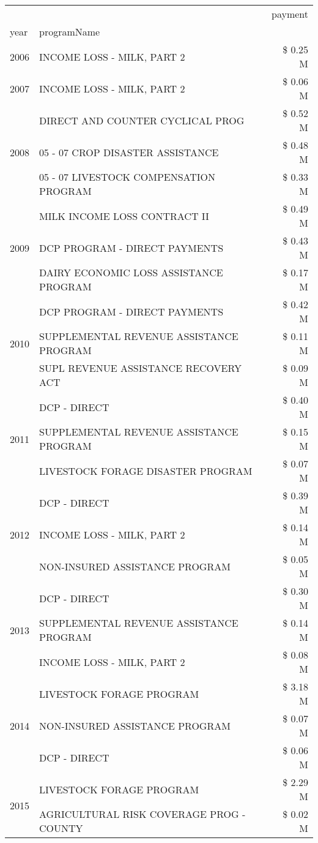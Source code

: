 \begin{tabular}{llr}
\toprule
 &  & payment \\
year & programName &  \\
\midrule
2006 & INCOME LOSS - MILK, PART 2 & \$ 0.25 M \\
\cline{1-3}
2007 & INCOME LOSS - MILK, PART 2 & \$ 0.06 M \\
\cline{1-3}
\multirow[t]{3}{*}{2008} & DIRECT AND COUNTER CYCLICAL PROG & \$ 0.52 M \\
 & 05 - 07 CROP DISASTER ASSISTANCE & \$ 0.48 M \\
 & 05 - 07 LIVESTOCK COMPENSATION PROGRAM & \$ 0.33 M \\
\cline{1-3}
\multirow[t]{3}{*}{2009} & MILK INCOME LOSS CONTRACT II & \$ 0.49 M \\
 & DCP PROGRAM - DIRECT PAYMENTS & \$ 0.43 M \\
 & DAIRY ECONOMIC LOSS ASSISTANCE PROGRAM & \$ 0.17 M \\
\cline{1-3}
\multirow[t]{3}{*}{2010} & DCP PROGRAM - DIRECT PAYMENTS & \$ 0.42 M \\
 & SUPPLEMENTAL REVENUE ASSISTANCE PROGRAM & \$ 0.11 M \\
 & SUPL REVENUE ASSISTANCE RECOVERY ACT & \$ 0.09 M \\
\cline{1-3}
\multirow[t]{3}{*}{2011} & DCP - DIRECT & \$ 0.40 M \\
 & SUPPLEMENTAL REVENUE ASSISTANCE PROGRAM & \$ 0.15 M \\
 & LIVESTOCK FORAGE DISASTER PROGRAM & \$ 0.07 M \\
\cline{1-3}
\multirow[t]{3}{*}{2012} & DCP - DIRECT & \$ 0.39 M \\
 & INCOME LOSS - MILK, PART 2 & \$ 0.14 M \\
 & NON-INSURED ASSISTANCE PROGRAM & \$ 0.05 M \\
\cline{1-3}
\multirow[t]{3}{*}{2013} & DCP - DIRECT & \$ 0.30 M \\
 & SUPPLEMENTAL REVENUE ASSISTANCE PROGRAM & \$ 0.14 M \\
 & INCOME LOSS - MILK, PART 2 & \$ 0.08 M \\
\cline{1-3}
\multirow[t]{3}{*}{2014} & LIVESTOCK FORAGE PROGRAM & \$ 3.18 M \\
 & NON-INSURED ASSISTANCE PROGRAM & \$ 0.07 M \\
 & DCP - DIRECT & \$ 0.06 M \\
\cline{1-3}
\multirow[t]{3}{*}{2015} & LIVESTOCK FORAGE PROGRAM & \$ 2.29 M \\
 & AGRICULTURAL RISK COVERAGE PROG - COUNTY & \$ 0.02 M \\

\end{tabular}
